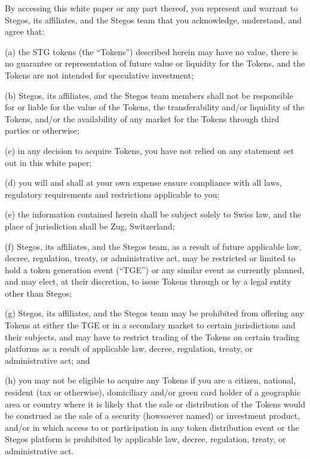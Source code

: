 \documentclass[8pt,fleqn,openany]{book}
\begin{document}
By accessing this white paper or any part thereof, you represent and warrant to Stegos, its affiliates, and the Stegos team that you acknowledge, understand, and agree that: 

(a) the STG tokens (the “Tokens”) described herein may have no value, there is no guarantee or representation of future value or liquidity for the Tokens, and the Tokens are not intended for speculative investment; 

(b) Stegos, its affiliates, and the Stegos team members shall not be responsible for or liable for the value of the Tokens, the transferability and/or liquidity of the Tokens, and/or the availability of any market for the Tokens through third parties or otherwise; 

(c) in any decision to acquire Tokens, you have not relied on any statement set out in this white paper; 

(d) you will and shall at your own expense ensure compliance with all laws, regulatory requirements and restrictions applicable to you; 

(e) the information contained herein shall be subject solely to Swiss law, and the place of jurisdiction shall be Zug, Switzerland; 

(f) Stegos, its affiliates, and the Stegos team, as a result of future applicable law, decree, regulation, treaty, or administrative act, may be restricted or limited to hold a token generation event (“TGE”) or any similar event as currently planned, and may elect, at their discretion, to issue Tokens through or by a legal entity other than Stegos; 

(g) Stegos, its affiliates, and the Stegos team may be prohibited from offering any Tokens at either the TGE or in a secondary market to certain jurisdictions and their subjects, and may have to restrict trading of the Tokens on certain trading platforms as a result of applicable law, decree, regulation, treaty, or administrative act; and 

(h) you may not be eligible to acquire any Tokens if you are a citizen, national, resident (tax or otherwise), domiciliary and/or green card holder of a geographic area or country where it is likely that the sale or distribution of the Tokens would be construed as the sale of a security (howsoever named) or investment product, and/or in which access to or participation in any token distribution event or the Stegos platform is prohibited by applicable law, decree, regulation, treaty, or administrative act. 
\end{document}
